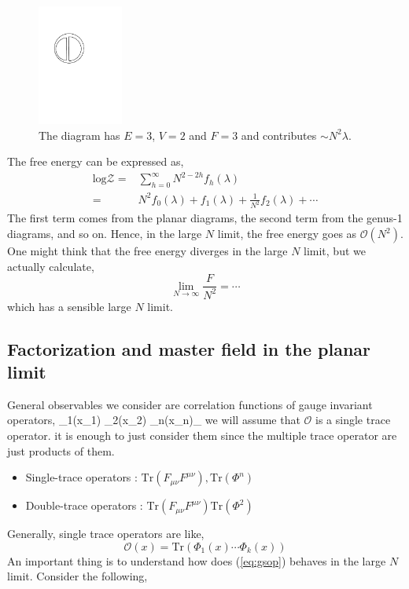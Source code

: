 \begin{figure}
\begin{center}\includegraphics[width=0.25\textwidth]{./Figures/DL4}\end{center}
\caption{\label{fig:dl99}The diagram has $E=3$, $V=2$ and $F=3$ and contributes $\sim N^2 \lambda $.}
\end{figure}
The free energy can be expressed as, 
\begin{align}
  \label{eq:logZ}
   \text{log} \mathscr{Z} =&\sum_{h=0}^{\infty} N^{2-2h} f_{h}(\lambda) \\ 
   				    =& N^{2} f_{0}(\lambda) + f_{1}(\lambda) + \frac{1}{N^2} f_{2}(\lambda) + \cdots
\end{align}
The first term comes from the planar diagrams, the second term from the genus-1 diagrams, and so on.
Hence, in the large $N$ limit, the free energy goes as $\mathscr{O}(N^2)$. 
One might think that the free energy diverges in the large $N$ limit, but we actually calculate, 
\[ \displaystyle\lim_{N \to \infty} \frac{F}{N^2} = \cdots  \] 
which has a sensible large $N$ limit. 

\subsection{Factorization and master field in the planar limit}
General observables we consider are correlation functions of gauge invariant operators, 
\beq
 \label{eq:gsop}
\langle {}_{1}(x_{1}) _{2}(x_{2}) \cdots {}_{n}(x_{n})\rangle_{}
\eeq 
we will assume that $\mathcal{O}$ is a single trace operator. it is enough to just consider 
them since the multiple trace operator are just products of them. 
\begin{itemize}
\item Single-trace operators : $\mathrm{Tr}(F_{\mu\nu}F^{\mu\nu}) , \mathrm{Tr}(\Phi^n)$ 
\item Double-trace operators : $\mathrm{Tr}(F_{\mu\nu}F^{\mu\nu})\mathrm{Tr}(\Phi^2)$ 
\end{itemize}
Generally, single trace operators are like, 
\begin{equation}
 \mathcal{O}(x)  = \mathrm{Tr} (\Phi_{1}(x) \cdots \Phi_{k}(x)) 
 \end{equation}
An important thing is to understand how does (\ref{eq:gsop}) behaves in the large $N$ limit. 
Consider the following, 


